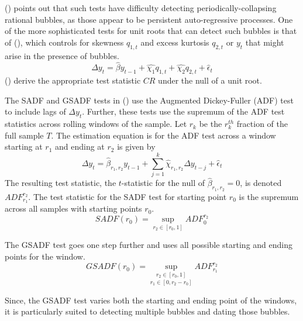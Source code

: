 \documentclass[12pt]{article}
\begin{document}
\citeauthor{evans1991pitfalls} (\citeyear{evans1991pitfalls}) points out that such tests have difficulty detecting periodically-collapsing rational bubbles, as those appear to be persistent auto-regressive processes. One of the more sophisticated tests for unit roots that can detect such bubbles is that of \citeauthor{TaylorPeel1998} (\citeyear{TaylorPeel1998}), which controls for skewness $q_{1,t}$ and excess kurtosis $q_{2,t}$ or $y_{t}$ that might arise in the presence of bubbles.
\begin{equation}
    \Delta y_{t}=\hat{\beta} y_{t-1} +\hat{\chi_{1}}q_{1,t}+\hat{\chi_{2}}q_{2,t}+  \hat{\epsilon}_{t}
    \label{TP}
\end{equation}
\citeauthor{TaylorPeel1998} (\citeyear{TaylorPeel1998}) derive the appropriate test statistic $CR$ under the null of a unit root.

The SADF and GSADF tests in  \citeauthor{phillips2015testing} (\citeyear{phillips2015testing}) use the Augmented Dickey-Fuller (ADF) test to include lags of $\Delta y_{t}$. Further, these tests use the supremum of the ADF test statistics across rolling windows of the sample. Let $r_{k}$ be the $r_{k}^{th}$ fraction of the full sample $T$. The estimation equation is for the ADF test across a window starting at $r_{1}$ and ending at $r_{2}$ is given by
\begin{equation}
    \Delta y_{t}=\hat{\beta}_{r_{1},r_{2}} y_{t-1} +\sum_{j=1}^{k}\hat{\chi}_{r_{1},r_{2}}\Delta y_{t-j} + \hat{\epsilon}_{t}
\end{equation}
The resulting test statistic, the $t$-statistic for the null of $\hat{\beta}_{r_{1},r_{2}}=0$, is denoted $ADF_{r_{1}}^{r_{2}}$. The test statistic for the SADF test for starting point $r_{0}$ is the supremum across all samples with starting points $r_{0}$.
\begin{equation}
SADF(r_{0})=\sup_{r_{2}\in[r_{0},1]}ADF_{0}^{r_{2}}
\label{SADF}
\end{equation}

The GSADF test goes one step further and uses all possible starting and ending points for the window.
\begin{equation}
   GSADF(r_{0})=\underset{{r_{1}\in[0,r_{2}-r_{0}]}}{{\sup_{r_{2}\in[r_{0},1]}}}ADF_{r_{1}}^{r_{2}} 
   \label{GSADF}
\end{equation}

Since, the GSADF test varies both the starting and ending point of the windows, it is particularly suited to detecting multiple bubbles and dating those bubbles.
\end{document}

